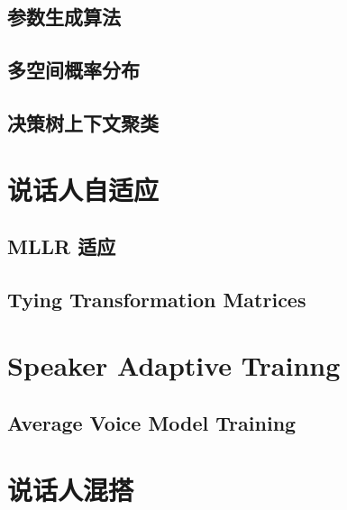 \subsection{参数生成算法}
\subsection{多空间概率分布}	%
\subsection{决策树上下文聚类} %
\section{说话人自适应}
\subsection{MLLR 适应}
\subsection{Tying Transformation Matrices}
\section{Speaker Adaptive Trainng}
\subsection{Average Voice Model Training}
\section{说话人混搭}